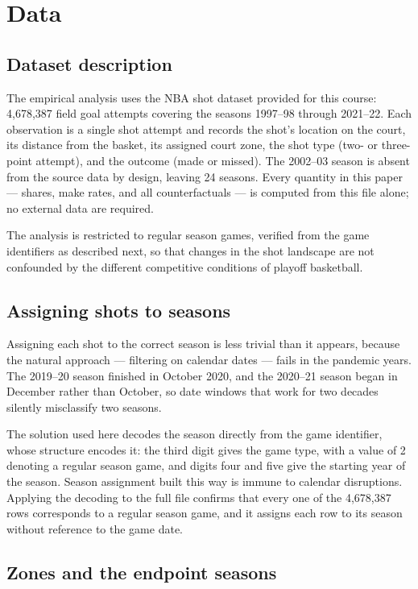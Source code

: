 \documentclass[12pt]{article}
\begin{document}
\section{Data}

\subsection{Dataset description}

The empirical analysis uses the NBA shot dataset provided for this course:
4,678,387 field goal attempts covering the seasons 1997--98 through 2021--22.
Each observation is a single shot attempt and records the shot's location on
the court, its distance from the basket, its assigned court zone, the shot
type (two- or three-point attempt), and the outcome (made or missed). The
2002--03 season is absent from the source data by design, leaving 24 seasons.
Every quantity in this paper --- shares, make rates, and all counterfactuals
--- is computed from this file alone; no external data are required.

The analysis is restricted to regular season games, verified from the game
identifiers as described next, so that changes in the shot landscape are not
confounded by the different competitive conditions of playoff basketball.

\subsection{Assigning shots to seasons}

Assigning each shot to the correct season is less trivial than it appears,
because the natural approach --- filtering on calendar dates --- fails in the
pandemic years. The 2019--20 season finished in October 2020, and the
2020--21 season began in December rather than October, so date windows that
work for two decades silently misclassify two seasons.

The solution used here decodes the season directly from the game identifier,
whose structure encodes it: the third digit gives the game type, with a value
of 2 denoting a regular season game, and digits four and five give the
starting year of the season. Season assignment built this way is immune to
calendar disruptions. Applying the decoding to the full file confirms that
every one of the 4,678,387 rows corresponds to a regular season game, and it
assigns each row to its season without reference to the game date.

\subsection{Zones and the endpoint seasons}
\end{document}
